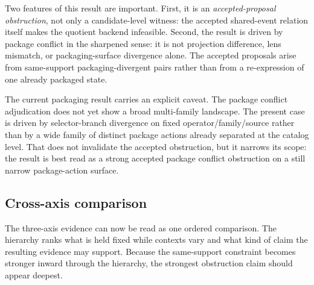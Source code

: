 \documentclass[11pt]{article}
\theoremstyle{definition}
\begin{document}
Two features of this result are important. First, it is an \emph{accepted-proposal obstruction}, not only a candidate-level witness: the accepted shared-event relation itself makes the quotient backend infeasible. Second, the result is driven by package conflict in the sharpened sense: it is not projection difference, lens mismatch, or packaging-surface divergence alone. The accepted proposals arise from same-support packaging-divergent pairs rather than from a re-expression of one already packaged state.

The current packaging result carries an explicit caveat. The package conflict adjudication does not yet show a broad multi-family landscape. The present case is driven by selector-branch divergence on fixed operator/family/source rather than by a wide family of distinct package actions already separated at the catalog level. That does not invalidate the accepted obstruction, but it narrows its scope: the result is best read as a strong accepted package conflict obstruction on a still narrow package-action surface.

\subsection{Cross-axis comparison}\label{sec:discovery-comparison}

The three-axis evidence can now be read as one ordered comparison. The hierarchy ranks what is held fixed while contexts vary and what kind of claim the resulting evidence may support. Because the same-support constraint becomes stronger inward through the hierarchy, the strongest obstruction claim should appear deepest.
\end{document}

